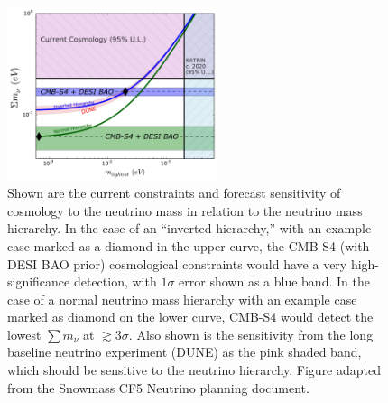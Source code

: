 
\begin{figure}[h!]
\centering \includegraphics[width=0.55\textwidth]{Neutrinos/numass_combine_dune}
\caption{Shown are the current constraints and forecast sensitivity of
  cosmology to the neutrino mass in relation to the neutrino mass
  hierarchy.  In the case of an ``inverted hierarchy,'' with an
  example case marked as a diamond in the upper curve, the CMB-S4 (with DESI BAO prior)
  cosmological constraints would have a very high-significance
  detection, with $1\sigma$ error shown as a blue band.  In the case
  of a normal neutrino mass hierarchy with an example case marked as
  diamond on the lower curve, CMB-S4 would detect the lowest
  $\sum m_\nu$ at $\gtrsim 3 \sigma$. Also shown is the
  sensitivity from the long baseline neutrino experiment (DUNE) as the
  pink shaded band, which should be sensitive to the neutrino
  hierarchy. Figure adapted from the Snowmass CF5 Neutrino planning document.
 }
\label{fig:neutrino-noose}
\end{figure}


